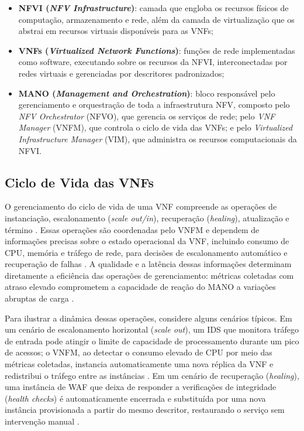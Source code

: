 \begin{itemize}
    \item \textbf{NFVI (\textit{NFV Infrastructure})}: camada que engloba os recursos físicos de computação, armazenamento e rede, além da camada de virtualização que os abstrai em recursos virtuais disponíveis para as VNFs;
    \item \textbf{VNFs (\textit{Virtualized Network Functions})}: funções de rede implementadas como software, executando sobre os recursos da NFVI, interconectadas por redes virtuais e gerenciadas por descritores padronizados;
    \item \textbf{MANO (\textit{Management and Orchestration})}: bloco responsável pelo gerenciamento e orquestração de toda a infraestrutura NFV, composto pelo \textit{NFV Orchestrator} (NFVO), que gerencia os serviços de rede; pelo \textit{VNF Manager} (VNFM), que controla o ciclo de vida das VNFs; e pelo \textit{Virtualized Infrastructure Manager} (VIM), que administra os recursos computacionais da NFVI.
\end{itemize}

\subsection{Ciclo de Vida das VNFs}

O gerenciamento do ciclo de vida de uma VNF compreende as operações de instanciação, escalonamento (\textit{scale out/in}), recuperação (\textit{healing}), atualização e término \cite{repec:wly:intnem:v:31:y:2021:i:5:n:e2068}. Essas operações são coordenadas pelo VNFM e dependem de informações precisas sobre o estado operacional da VNF, incluindo consumo de CPU, memória e tráfego de rede, para decisões de escalonamento automático e recuperação de falhas \cite{10.23919}. A qualidade e a latência dessas informações determinam diretamente a eficiência das operações de gerenciamento: métricas coletadas com atraso elevado comprometem a capacidade de reação do MANO a variações abruptas de carga \cite{oliveira_observability_2026}.

Para ilustrar a dinâmica dessas operações, considere alguns cenários típicos. Em um cenário de escalonamento horizontal (\textit{scale out}), um IDS que monitora tráfego de entrada pode atingir o limite de capacidade de processamento durante um pico de acessos; o VNFM, ao detectar o consumo elevado de CPU por meio das métricas coletadas, instancia automaticamente uma nova réplica da VNF e redistribui o tráfego entre as instâncias \cite{NIKBAZM2022102632, repec:wly:intnem:v:31:y:2021:i:5:n:e2068}. Em um cenário de recuperação (\textit{healing}), uma instância de WAF que deixa de responder a verificações de integridade (\textit{health checks}) é automaticamente encerrada e substituída por uma nova instância provisionada a partir do mesmo descritor, restaurando o serviço sem intervenção manual \cite{repec:wly:intnem:v:31:y:2021:i:5:n:e2068, mijumbi2016}.

